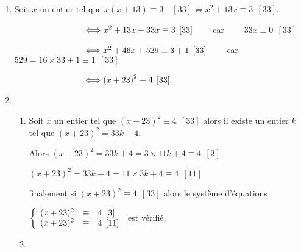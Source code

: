 \documentclass[11pt,a4paper,answers,fancyhdr]{exam}
\newcommand{\equi}{\Longleftrightarrow}
\newcommand{\x}{\times}
\begin{document}
\begin{enumerate}
\item %

\begin{solution}
Soit $x$ un entier tel que $x(x + 13) \equiv 3\quad [33] \equi x^2+13x \equiv 3\:\: [33]$.

$\hphantom{x(x + 13) \equiv 3\:\:[33]} \equi x^2+13x + 33x  \equiv 3\:\: [33]$~~~~ car~~~~ $33x \equiv 0\:\: [33]$

$\hphantom{x(x + 13) \equiv 3\:\: [33]} \equi x^2+46x+529 \equiv 3+1\:\: [33]$~~~~ car~~~~ $529=16\x33+1 \equiv 1\:\: [33]$

$\hphantom{x(x + 13) \equiv 3\:\: [33]} \equi \left(x+23 \right)^2  \equiv 4\:\:[33]$.
\end{solution}

\item
	\begin{enumerate}
		\item %

\begin{solution}

Soit $x$ un entier tel que $(x + 23)^2 \equiv 4\:\: [33]$  alors il existe un entier $k$ tel que $(x+23)^2=33k+4$.

Alors $(x+23)^2=33k+4 =3\x11k + 4 \equiv 4 \:\: [3]$

$(x+23)^2=33k+4=11\x3k+4 \equiv 4 \:\: [11]$

finalement si $(x + 23)^2 \equiv 4\:\: [33]$ alors le système d'équations 

$\left\{\begin{array}{l c l}
(x + 23)^2 &\equiv &4 \:\: [3]\\ 
(x + 23)^2 &\equiv &4 \:\: [11]
\end{array}\right.$ est vérifié.
\end{solution}

		\item %


\end{enumerate}
\end{enumerate}
\end{document}
